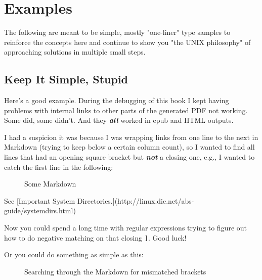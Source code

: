 \documentclass[10pt,american,]{book}
\newenvironment{Shaded}{\begin{snugshade}}{\end{snugshade}}
\newcommand{\KeywordTok}[1]{\textcolor[rgb]{0.13,0.29,0.53}{\textbf{{#1}}}}
\newcommand{\StringTok}[1]{\textcolor[rgb]{0.31,0.60,0.02}{{#1}}}
\newcommand{\OtherTok}[1]{\textcolor[rgb]{0.56,0.35,0.01}{{#1}}}
\newcommand{\NormalTok}[1]{{#1}}
\numberwithin{figure}{chapter}
\DeclareRobustCommand{\drcap}[1]{\begin{figure}[H]\caption{#1}\end{figure}}
\renewcommand{\KeywordTok}[1]{{#1}}
\renewcommand{\StringTok}[1]{{#1}}
\renewcommand{\OtherTok}[1]{{#1}}
\renewcommand{\NormalTok}[1]{{#1}}
\begin{document}
\section*{Examples}\label{examples}

The following are meant to be simple, mostly "one-liner" type samples to
reinforce the concepts here and continue to show you "the UNIX
philosophy" of approaching solutions in multiple small steps.

\subsection*{Keep It Simple, Stupid}\label{keep-it-simple-stupid}

Here's a good example. During the debugging of this book I kept having
problems with internal links to other parts of the generated PDF not
working. Some did, some didn't. And they \textbf{\emph{all}} worked in
epub and HTML outputs.

I had a suspicion it was because I was wrapping links from one line to
the next in Markdown (trying to keep below a certain column count), so I
wanted to find all lines that had an opening square bracket but
\textbf{\emph{not}} a closing one, e.g., I wanted to catch the first
line in the following:

\drcap{Some Markdown}

\begin{Shaded}
\begin{Highlighting}[]
\KeywordTok{See} \NormalTok{[Important System}
\KeywordTok{Directories.}\NormalTok{](http://linux.die.net/abs-guide/systemdirs.html)}
\end{Highlighting}
\end{Shaded}

Now you could spend a long time with regular expressions trying to
figure out how to do negative matching on that closing \texttt{{]}}.
Good luck!

Or you could do something as simple as this:

\drcap{Searching through the Markdown for mismatched brackets}

\begin{Shaded}
\begin{Highlighting}[]
\NormalTok{$ }\KeywordTok{grep} \StringTok{'\textbackslash{}['} \NormalTok{*.md }\KeywordTok{|} \KeywordTok{grep} \NormalTok{-v }\StringTok{']'}
\KeywordTok{Step01.md}\NormalTok{: (( expression ))           }\KeywordTok{if} \KeywordTok{COMMANDS;} \KeywordTok{then} \KeywordTok{COMMANDS; [} \NormalTok{elif C>}
\NormalTok{Step01.md: :                          kill [}\OtherTok{-s} \NormalTok{sigspec | }\OtherTok{-n} \NormalTok{signum | -sigs>}
\NormalTok{Step04.md:./FileCheckers/otschecker:  [ }\OtherTok{$rc} \OtherTok{!=} \NormalTok{0 }\OtherTok{-a} \StringTok{"}\OtherTok{$pdfinfo}\StringTok{"} \OtherTok{!=} \StringTok{"Comma...}
\StringTok{Step04.md:./FileCheckers/pdfpwdchecker: if [ }\OtherTok{$rc}\StringTok{ != 0 -a "}\OtherTok{$pdfinfo}\StringTok{" = "}\NormalTok{C...}
\end{Highlighting}
\end{Shaded}
\end{document}
